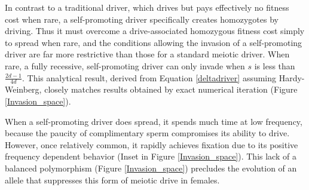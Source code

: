 \documentclass[12pt,letterpaper]{article}
\begin{document}
In contrast to a traditional driver, which drives but pays effectively
	no fitness cost when rare, 
	a self-promoting driver specifically creates homozygotes by driving. 
Thus it must overcome a drive-associated homozygous fitness cost simply to spread when rare,
	and the conditions allowing the invasion of a self-promoting driver
 	are far more restrictive than those for a standard meiotic driver.
When rare, a fully recessive, self-promoting driver can only invade when $s$ 
	is less than $\frac{2 d - 1}{4 d}$. 
This analytical result, derived  from Equation \eqref{deltadriver} assuming Hardy-Weinberg, 
	closely matches results obtained by exact numerical iteration (Figure \ref{Invasion_space}). 


When a self-promoting driver does spread, 
	it spends much time at low frequency, 
	because the paucity of complimentary sperm compromises its ability to drive. 
However, once relatively common, it  rapidly achieves fixation due to its
	positive frequency dependent behavior (Inset in Figure \ref{Invasion_space}).  
This lack of a balanced polymorphism (Figure \ref{Invasion_space}) precludes the evolution of an
	allele that suppresses this form of meiotic drive in females.
\end{document}
